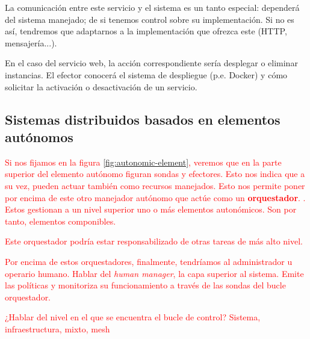 La comunicación entre este servicio y el sistema es un tanto especial: dependerá del sistema manejado; de si tenemos control sobre su implementación. Si no es así, tendremos que adaptarnos a la implementación que ofrezca este (HTTP, mensajería...).

En el caso del servicio web, la acción correspondiente sería desplegar o eliminar instancias. El efector conocerá el sistema de despliegue (p.e. Docker) y cómo solicitar la activación o desactivación de un servicio.

\subsection{Sistemas distribuidos basados en elementos autónomos}

\textcolor{red}{Si nos fijamos en la figura \ref{fig:autonomic-element}, veremos que en la parte superior del elemento autónomo figuran sondas y efectores. Esto nos indica que a su vez, pueden actuar también como recursos manejados. Esto nos permite poner por encima de este otro manejador autónomo que actúe como un \textbf{orquestador}. \cite{ibmcorporationArchitecturalBlueprintAutonomic2006}. Estos gestionan a un nivel superior uno o más elementos autonómicos. Son por tanto, elementos componibles.}

\textcolor{red}{Este orquestador podría estar responsabilizado de otras tareas de más alto nivel.}

\textcolor{red}{Por encima de estos orquestadores, finalmente, tendríamos al administrador u operario humano.}
\textcolor{red}{Hablar del \emph{human manager}, la capa superior al sistema. Emite las políticas y monitoriza su funcionamiento a través de las sondas del bucle orquestador.}


\textcolor{red}{¿Hablar del nivel en el que se encuentra el bucle de control? Sistema, infraestructura, mixto, mesh \cite{mendoncaGeneralityVsReusability2018}}

